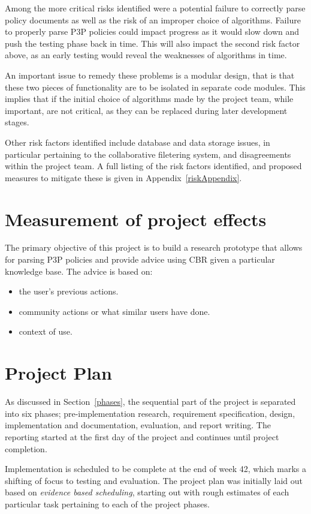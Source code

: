 Among the more critical risks identified were a potential failure to
correctly parse policy documents as well as the risk of an improper
choice of algorithms. Failure to properly parse P3P policies could
impact progress as it would slow down and push the testing phase back
in time. This will also impact the second risk factor above, as an
early testing would reveal the weaknesses of algorithms in time.

An important issue to remedy these problems is a modular design, that
is that these two pieces of functionality are to be isolated in
separate code modules. This implies that if the initial choice of algorithms
made by the project team, while important, are not critical, as they
can be replaced during later development stages.

Other risk factors identified include database and data storage
issues, in particular pertaining to the collaborative filetering
system, and disagreements within the project team. A full listing
of the risk factors identified, and proposed measures to mitigate
these is given in Appendix~\ref{riskAppendix}.


\section{Measurement of project effects}
The primary objective of this project is to build a research prototype that allows for parsing P3P policies and provide advice using CBR given a particular knowledge base. The advice is based on: 

\begin{itemize}
\item the user's previous actions.
\item community actions or what similar users have done.
\item context of use.
\end{itemize}
   

\section{Project Plan}
As discussed in Section~\ref{phases}, the sequential part of the project is separated into six phases; pre-implementation research, requirement specification, design, implementation and documentation, evaluation, and report writing. The reporting started at the first day of the project and continues until project completion. 

Implementation is scheduled to be complete at the end of week 42, which marks a shifting of focus to testing and evaluation. The project plan was initially laid out based on \emph{evidence based scheduling}, starting out with rough estimates of each particular task pertaining to each of the project phases. 

